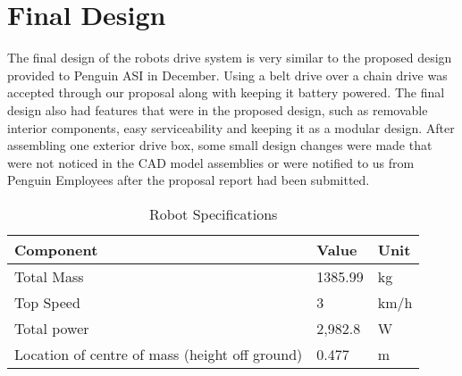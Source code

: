 \section{Final Design}
The final design of the robots drive system is very similar to the proposed design provided to Penguin ASI in December. Using a belt drive over a chain drive was accepted through our proposal along with keeping it battery powered. The final design also had features that were in the proposed design, such as removable interior components, easy serviceability and keeping it as a modular design. After assembling one exterior drive box, some small design changes were made that were not noticed in the CAD model assemblies or were notified to us from Penguin Employees after the proposal report had been submitted. 


\begin{table}[htbp]
\centering
\caption{Robot Specifications}
\begin{tabular}{| p{5cm}ll |} \hline
Component & Value & Unit \\ \hline
Total Mass & 1385.99 & kg \\
Top Speed & 3	& km/h \\
Total power & 2,982.8 & W \\
Location of centre of mass (height off ground) & 0.477 & m\\ \hline
 \end{tabular}
 \label{tab:specs}
 \end{table}